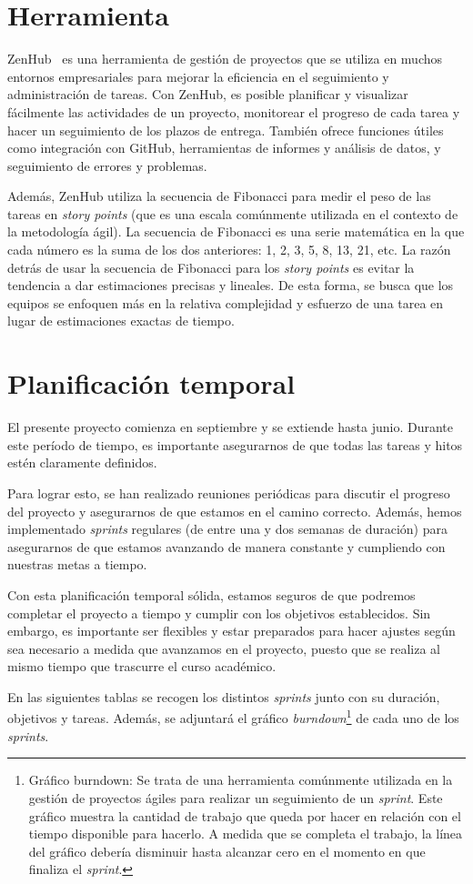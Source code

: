 \section{Herramienta}
ZenHub~\cite{Zenhub} es una herramienta de gestión de proyectos que se utiliza en muchos entornos empresariales para mejorar la eficiencia en el seguimiento y administración de tareas. Con ZenHub, es posible planificar y visualizar fácilmente las actividades de un proyecto, monitorear el progreso de cada tarea y hacer un seguimiento de los plazos de entrega. También ofrece funciones útiles como integración con GitHub, herramientas de informes y análisis de datos, y seguimiento de errores y problemas.

Además, ZenHub utiliza la secuencia de Fibonacci para medir el peso de las tareas en \textit{story points} (que es una escala comúnmente utilizada en el contexto de la metodología ágil). La secuencia de Fibonacci es una serie matemática en la que cada número es la suma de los dos anteriores: 1, 2, 3, 5, 8, 13, 21, etc. La razón detrás de usar la secuencia de Fibonacci para los \textit{story points} es evitar la tendencia a dar estimaciones precisas y lineales. De esta forma, se busca que los equipos se enfoquen más en la relativa complejidad y esfuerzo de una tarea en lugar de estimaciones exactas de tiempo. 

\section{Planificación temporal}
El presente proyecto comienza en septiembre y se extiende hasta junio. Durante este período de tiempo, es importante asegurarnos de que todas las tareas y hitos estén claramente definidos.

Para lograr esto, se han realizado reuniones periódicas para discutir el progreso del proyecto y asegurarnos de que estamos en el camino correcto. Además, hemos implementado \textit{sprints} regulares (de entre una y dos semanas de duración) para asegurarnos de que estamos avanzando de manera constante y cumpliendo con nuestras metas a tiempo.

Con esta planificación temporal sólida, estamos seguros de que podremos completar el proyecto a tiempo y cumplir con los objetivos establecidos. Sin embargo, es importante ser flexibles y estar preparados para hacer ajustes según sea necesario a medida que avanzamos en el proyecto, puesto que se realiza al mismo tiempo que trascurre el curso académico.

En las siguientes tablas se recogen los distintos \textit{sprints} junto con su duración, objetivos y tareas. Además, se adjuntará el gráfico \textit{burndown}\footnote{Gráfico burndown: Se trata de una herramienta comúnmente utilizada en la gestión de proyectos ágiles para realizar un seguimiento de un \textit{sprint}. Este gráfico muestra la cantidad de trabajo que queda por hacer en relación con el tiempo disponible para hacerlo. A medida que se completa el trabajo, la línea del gráfico debería disminuir hasta alcanzar cero en el momento en que finaliza el \textit{sprint}.} de cada uno de los \textit{sprints}.

